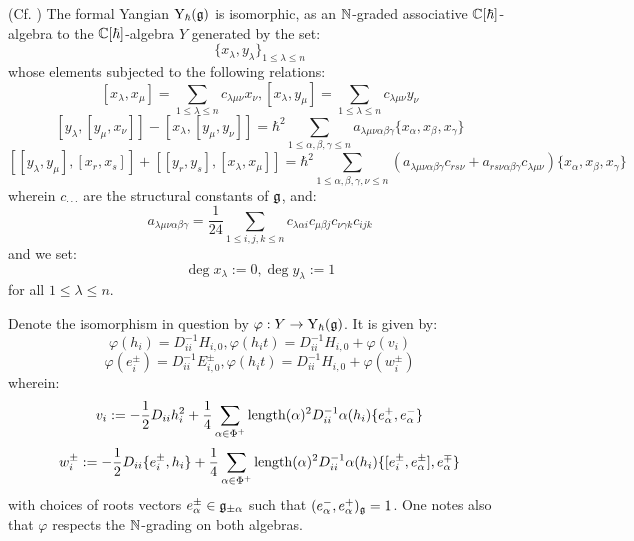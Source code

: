             \begin{theorem} \label{theorem: drinfeld_current_presentation}
                (Cf. \cite[Theorem 12.1.3]{chari_pressley_quantum_groups}) The formal Yangian $\mathrm{Y}_{\hbar}(\mathfrak{g})$ is isomorphic, as an $\mathbb{N}$-graded associative $\mathbb{C}[\hbar]$-algebra to the $\mathbb{C}[\hbar]$-algebra $Y$ generated by the set:
                    $$\{ x_{\lambda}, y_{\lambda} \}_{1 \leq \lambda \leq n}$$
                whose elements subjected to the following relations:
                    $$[ x_{\lambda}, x_{\mu} ] = \sum_{1 \leq \lambda \leq n} c_{\lambda \mu \nu} x_{\nu}, [ x_{\lambda}, y_{\mu} ] = \sum_{1 \leq \lambda \leq n} c_{\lambda \mu \nu} y_{\nu}$$
                    $$[ y_{\lambda}, [y_{\mu}, x_{\nu}] ] - [ x_{\lambda}, [y_{\mu}, y_{\nu}] ] = \hbar^2 \sum_{1 \leq \alpha, \beta, \gamma \leq n} a_{\lambda \mu \nu \alpha \beta \gamma} \{ x_{\alpha}, x_{\beta}, x_{\gamma} \}$$
                    $$[ [y_{\lambda}, y_{\mu}], [x_r, x_s] ] + [ [y_r, y_s], [x_{\lambda}, x_{\mu}] ] = \hbar^2 \sum_{1 \leq \alpha, \beta, \gamma, \nu \leq n} ( a_{\lambda \mu \nu \alpha \beta \gamma} c_{r s \nu} + a_{r s \nu \alpha \beta \gamma} c_{\lambda \mu \nu} ) \{ x_{\alpha}, x_{\beta}, x_{\gamma} \}$$
                wherein $c_{\cdot \cdot \cdot}$ are the structural constants of $\mathfrak{g}$, and:
                    $$a_{\lambda \mu \nu \alpha \beta \gamma} = \frac{1}{24} \sum_{1 \leq i, j, k \leq n} c_{\lambda \alpha i} c_{\mu \beta j} c_{\nu \gamma k} c_{i j k}$$
                and we set:
                    $$\deg x_{\lambda} := 0, \deg y_{\lambda} := 1$$
                for all $1 \leq \lambda \leq n$.
                
                Denote the isomorphism in question by $\varphi: Y \to \mathrm{Y}_{\hbar}(\mathfrak{g})$. It is given by:
                    $$\varphi(h_i) = D_{ii}^{-1} H_{i, 0}, \varphi(h_i t) = D_{ii}^{-1} H_{i, 0} + \varphi(v_i)$$
                    $$\varphi(e_i^{\pm}) = D_{ii}^{-1} E_{i, 0}^{\pm}, \varphi(h_i t) = D_{ii}^{-1} H_{i, 0} + \varphi(w_i^{\pm})$$
                wherein:
                    $$v_i := -\frac12 D_{ii} h_i^2 + \frac14 \sum_{\alpha \in \Phi^+} \operatorname{length}(\alpha)^2 D_{ii}^{-1} \alpha(h_i) \{e_{\alpha}^+, e_{\alpha}^-\}$$
                    $$w_i^{\pm} := -\frac12 D_{ii} \{e_i^{\pm}, h_i\} + \frac14 \sum_{\alpha \in \Phi^+} \operatorname{length}(\alpha)^2 D_{ii}^{-1} \alpha(h_i) \{[e_i^{\pm}, e_{\alpha}^{\pm}], e_{\alpha}^{\mp}\}$$
                with choices of roots vectors $e_{\alpha}^{\pm} \in \mathfrak{g}_{\pm \alpha}$ such that $(e_{\alpha}^-, e_{\alpha}^+)_{\mathfrak{g}} = 1$. One notes also that $\varphi$ respects the $\mathbb{N}$-grading on both algebras.
            \end{theorem}

